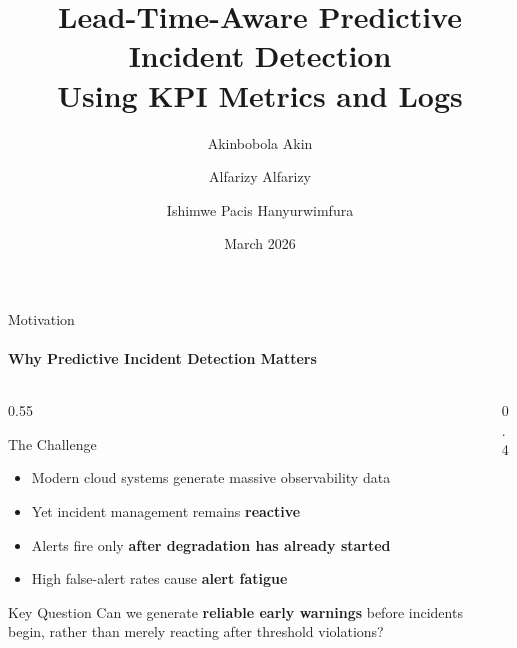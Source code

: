 \documentclass[aspectratio=169,11pt]{beamer}
\title[Lead-Time-Aware Predictive Incident Detection]{Lead-Time-Aware Predictive Incident Detection\\Using KPI Metrics and Logs}
\author[Akin, Alfarizy, Hanyurwimfura]{Akinbobola Akin \and Alfarizy Alfarizy \and Ishimwe Pacis Hanyurwimfura}
\institute[UNB]{University of New Brunswick \\ CS6905 -- Cloud Information Management Systems}
\date[Mar 2026]{March 2026}
\begin{document}
\begin{frame}
\titlepage
\end{frame}

\begin{frame}{Motivation}
\framesubtitle{Why Predictive Incident Detection Matters}

\begin{columns}
\begin{column}{0.55\textwidth}
\begin{block}{The Challenge}
\begin{itemize}
    \item Modern cloud systems generate massive observability data
    \item Yet incident management remains \textbf{reactive}
    \item Alerts fire only \textbf{after degradation has already started}
    \item High false-alert rates cause \textbf{alert fatigue}
\end{itemize}
\end{block}

\vspace{0.5em}
\begin{alertblock}{Key Question}
Can we generate \textbf{reliable early warnings} before incidents begin, rather than merely reacting after threshold violations?
\end{alertblock}
\end{column}

\begin{column}{0.4\textwidth}
\centering
{}
\end{column}
\end{columns}
\end{frame}
\end{document}
